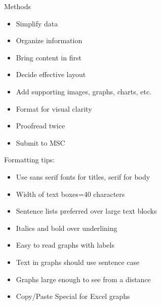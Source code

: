 \documentclass[pdf]{beamer}
\begin{document}
\begin{frame}{}
\begin{columns}[T,totalwidth=\textwidth]
\begin{column}{9.5in}
\begin{minipage}[t][\textheight]{\linewidth}
\begin{block}{Methods}
\begin{center}
\begin{minipage}{0.8\linewidth}
\begin{exampleblock}{}
\begin{itemize}
\item Simplify data
\item Organize information
\item Bring content in first
\item Decide effective layout
\item Add supporting images, graphs, charts, etc.
\item Format for visual clarity
\item Proofread twice
\item Submit to MSC
\end{itemize}
\end{exampleblock}
\end{minipage}
\end{center}
\vspace*{2.5in}

Formatting tips:
\begin{itemize}
\item Use sans serif fonts for titles, serif for body
\item Width of text boxes=40 characters
\item Sentence lists preferred over large text blocks
\item Italics and bold over underlining
\item Easy to read graphs with labels
\item Text in graphs should use sentence case
\item Graphs large enough to see from a distance
\item Copy/Paste Special for Excel graphs
\end{itemize}
\end{block}
\end{minipage}
\end{column}


\begin{column}{9.5in}%
\begin{minipage}[t][\textheight]{\linewidth}

\end{minipage}
\end{column}
\end{columns}
\end{frame}
\end{document}
